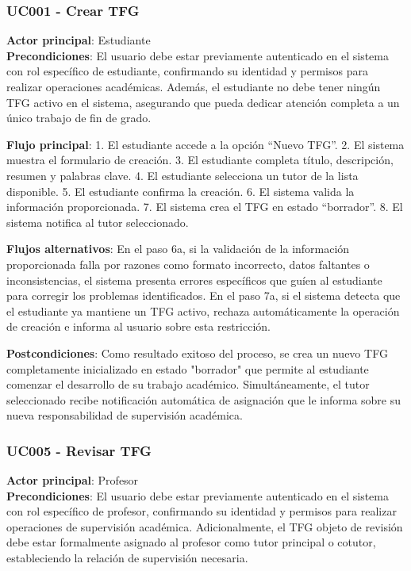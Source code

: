 \documentclass[12pt,a4paper,oneside]{report}
\begin{document}
\subsubsection{UC001 - Crear TFG}\label{uc001---crear-tfg}

\textbf{Actor principal}: Estudiante\\
\textbf{Precondiciones}: El usuario debe estar previamente autenticado en el sistema con rol específico de estudiante, confirmando su identidad y permisos para realizar operaciones académicas. Además, el estudiante no debe tener ningún TFG activo en el sistema, asegurando que pueda dedicar atención completa a un único trabajo de fin de grado.

\textbf{Flujo principal}: 1. El estudiante accede a la opción ``Nuevo
TFG''. 2. El sistema muestra el formulario de creación. 3. El estudiante
completa título, descripción, resumen y palabras clave. 4. El estudiante
selecciona un tutor de la lista disponible. 5. El estudiante confirma la
creación. 6. El sistema valida la información proporcionada. 7. El
sistema crea el TFG en estado ``borrador''. 8. El sistema notifica al
tutor seleccionado.

\textbf{Flujos alternativos}: En el paso 6a, si la validación de la información proporcionada falla por razones como formato incorrecto, datos faltantes o inconsistencias, el sistema presenta errores específicos que guíen al estudiante para corregir los problemas identificados. En el paso 7a, si el sistema detecta que el estudiante ya mantiene un TFG activo, rechaza automáticamente la operación de creación e informa al usuario sobre esta restricción.

\textbf{Postcondiciones}: Como resultado exitoso del proceso, se crea un nuevo TFG completamente inicializado en estado "borrador" que permite al estudiante comenzar el desarrollo de su trabajo académico. Simultáneamente, el tutor seleccionado recibe notificación automática de asignación que le informa sobre su nueva responsabilidad de supervisión académica.

\subsubsection{UC005 - Revisar TFG}\label{uc005---revisar-tfg}

\textbf{Actor principal}: Profesor\\
\textbf{Precondiciones}: El usuario debe estar previamente autenticado en el sistema con rol específico de profesor, confirmando su identidad y permisos para realizar operaciones de supervisión académica. Adicionalmente, el TFG objeto de revisión debe estar formalmente asignado al profesor como tutor principal o cotutor, estableciendo la relación de supervisión necesaria.
\end{document}
